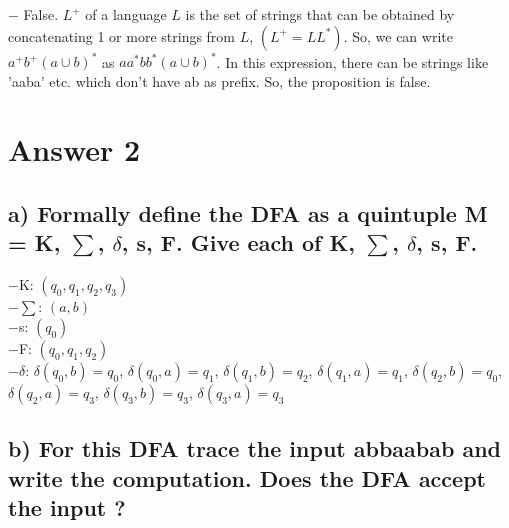 \documentclass[12pt]{article}
\begin{document}
	$-$ False. $L^+$ of a language $L$ is the set of strings that can be obtained by concatenating 1 or more strings from $L$, $(L^+ = LL^*)$. So, we can write $a^{+}b^{+}(a \cup b)^{*}$ as $aa^{*}bb^{*}(a \cup b)^{*}$. In this expression, there can be strings like 'aaba' etc. which don't have ab as prefix. So, the proposition is false.

\section*{Answer 2}

\subsection*{a) Formally define the DFA as a quintuple M = {K, $\sum$, $\delta$, s, F}. Give each of K, $\sum$, $\delta$, s, F.} 

	$-$K: $(q_0, q_1, q_2, q_3)$ \\
	$-$$\sum$: $(a,b)$ \\
	$-$s: $(q_0)$ \\
	$-$F: $(q_0, q_1, q_2)$ \\
	$-$$\delta$: $\delta(q_0,b) = q_0$, $\delta(q_0,a) = q_1$, $\delta(q_1,b) = q_2$, $\delta(q_1,a) = q_1$, $\delta(q_2,b) = q_0$, $\delta(q_2,a) = q_3$, $\delta(q_3,b) = q_3$, $\delta(q_3,a) = q_3$

	
	
	
	
	
	

\subsection*{b) For this DFA trace the input abbaabab and write the computation. Does the DFA accept the input ?}
\end{document}
